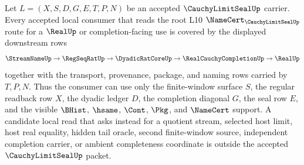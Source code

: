 \begin{lemma}
\label{lem:cauchy-limit-seal-root-l10-downstream-coverage}
Let $L=(X,S,D,G,E,T,P,N)$ be an accepted $\CauchyLimitSealUp$ carrier. Every accepted local consumer that reads the root L10 $\NameCert_{\CauchyLimitSealUp}$ route for a $\RealUp$ or completion-facing use is covered by the displayed downstream rows
$$
\StreamNameUp \to \RegSeqRatUp \to \DyadicRatCoreUp \to \RealCauchyCompletionUp \to \RealUp
$$
together with the transport, provenance, package, and naming rows carried by $T,P,N$. Thus the consumer can use only the finite-window surface $S$, the regular readback row $X$, the dyadic ledger $D$, the completion diagonal $G$, the seal row $E$, and the visible $\BHist$, $\hsame$, $\Cont$, $\Pkg$, and $\NameCert$ support. A candidate local read that asks instead for a quotient stream, selected host limit, host real equality, hidden tail oracle, second finite-window source, independent completion carrier, or ambient completeness coordinate is outside the accepted $\CauchyLimitSealUp$ packet.
\end{lemma}
